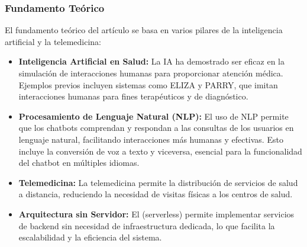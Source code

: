 	\subsubsection{Fundamento Teórico}
		El fundamento teórico del artículo se basa en varios pilares de la inteligencia artificial y la telemedicina:
		\begin{itemize}
			\item \textbf{Inteligencia Artificial en Salud:} La IA ha demostrado ser eficaz en la simulación de interacciones humanas para proporcionar atención médica. Ejemplos previos incluyen sistemas como ELIZA y PARRY, que imitan interacciones humanas para fines terapéuticos y de diagnóstico.
			\item \textbf{Procesamiento de Lenguaje Natural (NLP):} El uso de NLP permite que los chatbots comprendan y respondan a las consultas de los usuarios en lenguaje natural, facilitando interacciones más humanas y efectivas. Esto incluye la conversión de voz a texto y viceversa, esencial para la funcionalidad del chatbot en múltiples idiomas.
			\item \textbf{Telemedicina:} La telemedicina permite la distribución de servicios de salud a distancia, reduciendo la necesidad de visitas físicas a los centros de salud.
			\item \textbf{Arquitectura sin Servidor:} El (serverless) permite implementar servicios de backend sin necesidad de infraestructura dedicada, lo que facilita la escalabilidad y la eficiencia del sistema.
		\end{itemize}

